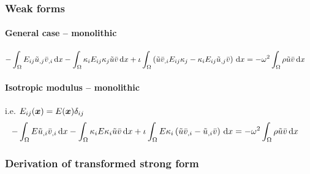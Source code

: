 \subsubsection{Weak forms} \label{it.scalar.weak}

\paragraph{General case -- monolithic}
%
\begin{align}
    - \int_{\Omega} {
        E_{ij} \tilde{u}_{,j} \bar{v}_{,i} \,\mathrm{d}x
    } - \int_{\Omega} {
        \kappa_{i} E_{ij} \kappa_{j} \tilde{u} \bar{v} \,\mathrm{d}x
    } + \iota \int_{\Omega} {
        \left(
        \tilde{u} \bar{v}_{,i} E_{ij} \kappa_{j}
        - \kappa_{i} E_{ij} \tilde{u}_{,j} \bar{v}
        \right) \,\mathrm{d}x
    } &=
    -\omega^2 \int_{\Omega} { \rho \tilde{u} \bar{v} \,\mathrm{d}x }
    \label{eq:it.scalar.weak.general}
\end{align}

\paragraph{Isotropic modulus -- monolithic} i.e. \(E_{ij}(\boldsymbol{x}) = E(\boldsymbol{x}) \delta_{ij}\)
%
\begin{align}
    - \int_{\Omega} {
        E \tilde{u}_{,i} \bar{v}_{,i} \,\mathrm{d}x
    } - \int_{\Omega} {
        \kappa_{i} E \kappa_{i} \tilde{u} \bar{v} \,\mathrm{d}x
    } + \iota \int_{\Omega} {
        E \kappa_{i} \left(
        \tilde{u} \bar{v}_{,i} - \tilde{u}_{,i} \bar{v}
        \right) \,\mathrm{d}x
    } &=
    -\omega^2 \int_{\Omega} { \rho \tilde{u} \bar{v} \,\mathrm{d}x }
    \label{eq:it.scalar.weak.iso}
\end{align}


\subsubsection{Derivation of transformed strong form}
\label{sec:it.scalar.strong-derivation}

